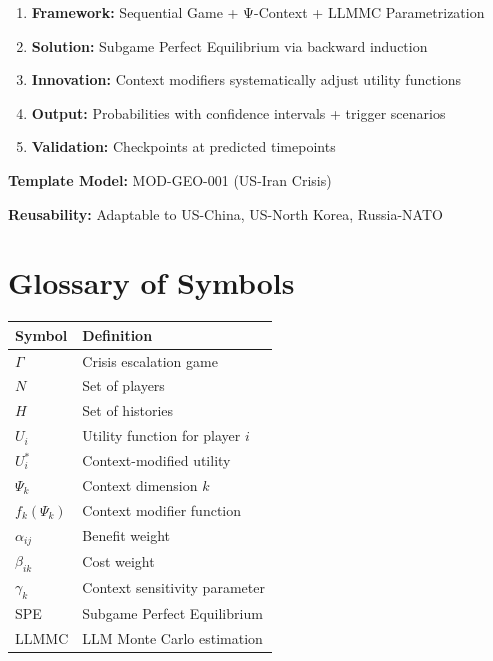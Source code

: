 \begin{tcolorbox}[colback=blue!5!white, colframe=blue!75!black,
    title=Key Takeaways: Crisis Escalation Modeling]

\begin{enumerate}
\item \textbf{Framework:} Sequential Game + Ψ-Context + LLMMC Parametrization
\item \textbf{Solution:} Subgame Perfect Equilibrium via backward induction
\item \textbf{Innovation:} Context modifiers systematically adjust utility functions
\item \textbf{Output:} Probabilities with confidence intervals + trigger scenarios
\item \textbf{Validation:} Checkpoints at predicted timepoints
\end{enumerate}

\textbf{Template Model:} MOD-GEO-001 (US-Iran Crisis)

\textbf{Reusability:} Adaptable to US-China, US-North Korea, Russia-NATO

\end{tcolorbox}



\section{Glossary of Symbols}
\label{sec:crisis-glossary}

\begin{tabular}{ll}
\toprule
\textbf{Symbol} & \textbf{Definition} \\
\midrule
$\Gamma$ & Crisis escalation game \\
$N$ & Set of players \\
$H$ & Set of histories \\
$U_i$ & Utility function for player $i$ \\
$U^*_i$ & Context-modified utility \\
$\Psi_k$ & Context dimension $k$ \\
$f_k(\Psi_k)$ & Context modifier function \\
$\alpha_{ij}$ & Benefit weight \\
$\beta_{ik}$ & Cost weight \\
$\gamma_k$ & Context sensitivity parameter \\
SPE & Subgame Perfect Equilibrium \\
LLMMC & LLM Monte Carlo estimation \\
\bottomrule
\end{tabular}

